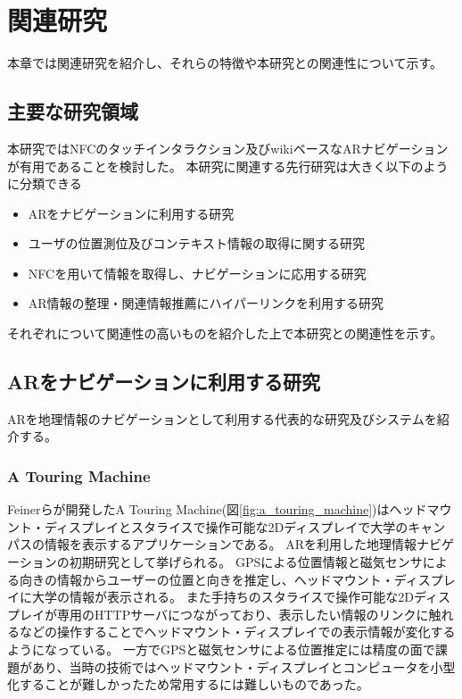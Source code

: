 \chapter{関連研究}
\label{chap:relatedResearch}

本章では関連研究を紹介し、それらの特徴や本研究との関連性について示す。

\newpage


\section{主要な研究領域}
本研究ではNFCのタッチインタラクション及びwikiベースなARナビゲーションが有用であることを検討した。
本研究に関連する先行研究は大きく以下のように分類できる
\begin{itemize}
  \item ARをナビゲーションに利用する研究
  \item ユーザの位置測位及びコンテキスト情報の取得に関する研究
  \item NFCを用いて情報を取得し、ナビゲーションに応用する研究
  \item AR情報の整理・関連情報推薦にハイパーリンクを利用する研究
\end{itemize}
それぞれについて関連性の高いものを紹介した上で本研究との関連性を示す。

\section{ARをナビゲーションに利用する研究}
ARを地理情報のナビゲーションとして利用する代表的な研究及びシステムを紹介する。

\subsection{A Touring Machine}
Feinerらが開発したA Touring Machine\cite{629922}(図\ref{fig:a_touring_machine})はヘッドマウント・ディスプレイとスタライスで操作可能な2Dディスプレイで大学のキャンパスの情報を表示するアプリケーションである。
ARを利用した地理情報ナビゲーションの初期研究として挙げられる。
GPSによる位置情報と磁気センサによる向きの情報からユーザーの位置と向きを推定し、ヘッドマウント・ディスプレイに大学の情報が表示される。
また手持ちのスタライスで操作可能な2Dディスプレイが専用のHTTPサーバにつながっており、表示したい情報のリンクに触れるなどの操作することでヘッドマウント・ディスプレイでの表示情報が変化するようになっている。
一方でGPSと磁気センサによる位置推定には精度の面で課題があり、当時の技術ではヘッドマウント・ディスプレイとコンピュータを小型化することが難しかったため常用するには難しいものであった。

